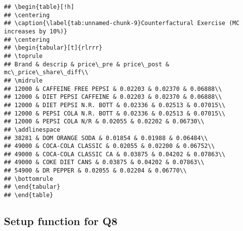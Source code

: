 \documentclass[
]{article}
\begin{document}
\begin{verbatim}
## \begin{table}[!h]
## \centering
## \caption{\label{tab:unnamed-chunk-9}Counterfactural Exercise (MC increases by 10%)}
## \centering
## \begin{tabular}[t]{rlrrr}
## \toprule
## Brand & descrip & price\_pre & price\_post & mc\_price\_share\_diff\\
## \midrule
## 12000 & CAFFEINE FREE PEPSI & 0.02203 & 0.02370 & 0.06888\\
## 12000 & DIET PEPSI CAFFEINE & 0.02203 & 0.02370 & 0.06888\\
## 12000 & DIET PEPSI N.R. BOTT & 0.02336 & 0.02513 & 0.07015\\
## 12000 & PEPSI COLA N.R. BOTT & 0.02336 & 0.02513 & 0.07015\\
## 12000 & PEPSI COLA N/R & 0.02055 & 0.02202 & 0.06730\\
## \addlinespace
## 38281 & DOM ORANGE SODA & 0.01854 & 0.01988 & 0.06484\\
## 49000 & COCA-COLA CLASSIC & 0.02055 & 0.02200 & 0.06752\\
## 49000 & COCA-COLA CLASSIC CA & 0.03875 & 0.04202 & 0.07863\\
## 49000 & COKE DIET CANS & 0.03875 & 0.04202 & 0.07863\\
## 54900 & DR PEPPER & 0.02055 & 0.02204 & 0.06770\\
## \bottomrule
## \end{tabular}
## \end{table}
\end{verbatim}

\hypertarget{setup-function-for-q8}{%
\subsection{Setup function for Q8}\label{setup-function-for-q8}}
\end{document}
